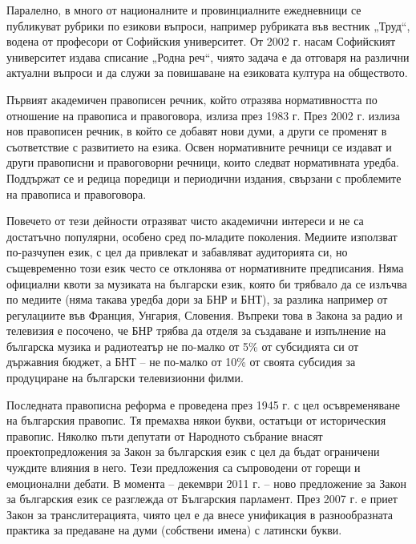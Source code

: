 \begin{multicols}{2}
  Паралелно, в много от националните и провинциалните ежедневници се публикуват рубрики по езикови въпроси,
   например рубриката във вестник „Труд“, водена от
   професори от Софийския университет. От 2002 г. насам
   Софийският университет издава списание „Родна реч“,
   чиято задача е да отговаря на различни актуални
   въпроси и да служи за повишаване на езиковата култура на
   обществото.


  Първият академичен правописен речник,
   който отразява нормативността по отношение на
   правописа и правоговора, излиза през 1983 г. През 2002
   г. излиза нов правописен речник, в който се добавят
   нови думи, а други се променят в съответствие с
   развитието на езика.
   Освен нормативните речници се издават и други
   правописни и правоговорни речници, които следват
   нормативната уредба. Поддържат се и редица поредици и периодични издания,
   свързани с проблемите на правописа и правоговора.

  Повечето от тези дейности отразяват чисто академични
   интереси и не са достатъчно популярни, особено сред по-младите поколения. Медиите използват по-разчупен
   език, с цел да привлекат и забавляват аудиторията си, но
   същевременно този език често се отклонява от
   нормативните предписания. Няма официални квоти за
   музиката на български език, която би трябвало да се
   излъчва по медиите (няма такава уредба дори за БНР и
   БНТ), за разлика например от регулациите във Франция, Унгария, Словения. Въпреки това в Закона за радио и телевизия е посочено, че БНР трябва да отделя за създаване и изпълнение на българска музика и радиотеатър не по-малко от 5\% от субсидията си от държавния
   бюджет, а БНТ – не по-малко от 10\% от своята субсидия
   за продуциране на български телевизионни филми.

  Последната правописна реформа е проведена през 1945
   г. с цел осъвременяване на българския правопис. Тя
   премахва някои букви, остатъци от историческия правопис. Няколко пъти депутати от Народното събрание внасят проектопредложения за Закон за българския език с цел да бъдат ограничени чуждите влияния в него. Тези предложения са съпроводени от горещи и емоционални дебати. В момента -- декември 2011 г. -- ново предложение за Закон за българския език се разглежда от Българския парламент. През 2007 г. е приет Закон за транслитерацията, чиято цел е да внесе унификация в разнообразната практика за предаване на
   думи (собствени имена) с латински букви.


\end{multicols}
